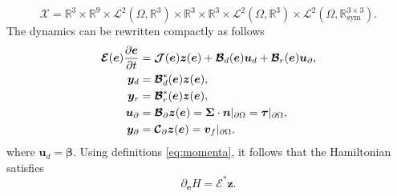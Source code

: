 \documentclass{svjour3}                     %
\begin{document}
	\[
	\mathscr{X} = \mathbb{R}^3 \times \mathbb{R}^9 \times \mathscr{L}^2(\Omega, \mathbb{R}^{3}) \times \mathbb{R}^3 \times \mathbb{R}^3 \times \mathscr{L}^2(\Omega, \mathbb{R}^{3}) \times \mathscr{L}^2(\Omega, \mathbb{R}^{3\times 3}_{\text{sym}}).
	\] 
	The dynamics can be rewritten compactly as follows
	\begin{equation}
	\label{eq:MFD_pHDAE}
	\begin{aligned}
	\bm{\mathcal{E}}(\bm{e}) \diffp{\bm{e}}{t} &= \bm{\mathcal{J}}(\bm{e}) \bm{z}(\bm{e}) + \bm{\mathcal{B}}_d(\bm{e}) \bm{u}_d + \bm{\mathcal{B}}_r(\bm{e}) \bm{u}_\partial, \\
	\bm{y}_d &= \bm{\mathcal{B}}_d^*(\bm{e}) \bm{z}(\bm{e}), \\
	\bm{y}_r &= \bm{\mathcal{B}}_r^*(\bm{e}) \bm{z}(\bm{e}), \\
	\bm{u}_\partial &= \bm{\mathcal{B}}_{\partial} \bm{z}(\bm{e}) =  \bm\Sigma \cdot \bm{n}|_{\partial \Omega} = \bm\tau|_{\partial \Omega}, \\
	\bm{y}_\partial &= \bm{\mathcal{C}}_{\partial} \bm{z}(\bm{e}) = \bm{v}_f|_{\partial \Omega},
	\end{aligned}
	\end{equation}
	where $\bm{u}_d = \bm\beta$. Using definitions  \eqref{eq:momenta}, it follows that the Hamiltonian  satisfies 
	\begin{equation}
	\label{eq:gradH}
	\partial_{\bm{e}} H = \bm{\mathcal{E}}^* \bm{z}.
	\end{equation}
	
\end{document}
